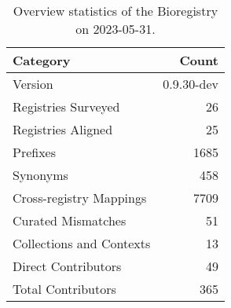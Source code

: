 \begin{table}
\caption{Overview statistics of the Bioregistry on 2023-05-31.}
\label{tab:bioregistry-summary}
\begin{tabular}{lr}
\toprule
Category & Count \\
\midrule
Version & 0.9.30-dev \\
Registries Surveyed & 26 \\
Registries Aligned & 25 \\
Prefixes & 1685 \\
Synonyms & 458 \\
Cross-registry Mappings & 7709 \\
Curated Mismatches & 51 \\
Collections and Contexts & 13 \\
Direct Contributors & 49 \\
Total Contributors & 365 \\
\bottomrule
\end{tabular}
\end{table}
